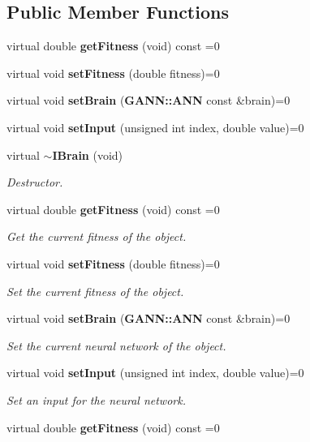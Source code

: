 \subsection*{Public Member Functions}
\begin{DoxyCompactItemize}
\item 
virtual double {\bfseries get\+Fitness} (void) const  =0\label{class_graphics_1_1_i_brain_a45403eb25f611290de9c53eaf7f6e800}

\item 
virtual void {\bfseries set\+Fitness} (double fitness)=0\label{class_graphics_1_1_i_brain_a1fdec2222c5a04a93c6918ed1f271947}

\item 
virtual void {\bfseries set\+Brain} ({\bf G\+A\+N\+N\+::\+A\+N\+N} const \&brain)=0\label{class_graphics_1_1_i_brain_a56c5f2f1f998551b571442b0225986e7}

\item 
virtual void {\bfseries set\+Input} (unsigned int index, double value)=0\label{class_graphics_1_1_i_brain_a768f7a2e586cafbbc7c4c2ae846a52be}

\item 
virtual {\bf $\sim$\+I\+Brain} (void)\label{class_graphics_1_1_i_brain_a9069cd56cdd867929c7f87d90c55f0c8}

\begin{DoxyCompactList}\small\item\em Destructor. \end{DoxyCompactList}\item 
virtual double {\bf get\+Fitness} (void) const  =0
\begin{DoxyCompactList}\small\item\em Get the current fitness of the object. \end{DoxyCompactList}\item 
virtual void {\bf set\+Fitness} (double fitness)=0
\begin{DoxyCompactList}\small\item\em Set the current fitness of the object. \end{DoxyCompactList}\item 
virtual void {\bf set\+Brain} ({\bf G\+A\+N\+N\+::\+A\+N\+N} const \&brain)=0
\begin{DoxyCompactList}\small\item\em Set the current neural network of the object. \end{DoxyCompactList}\item 
virtual void {\bf set\+Input} (unsigned int index, double value)=0
\begin{DoxyCompactList}\small\item\em Set an input for the neural network. \end{DoxyCompactList}\item 
virtual double {\bfseries get\+Fitness} (void) const  =0\label{class_graphics_1_1_i_brain_a45403eb25f611290de9c53eaf7f6e800}


\end{DoxyCompactItemize}
